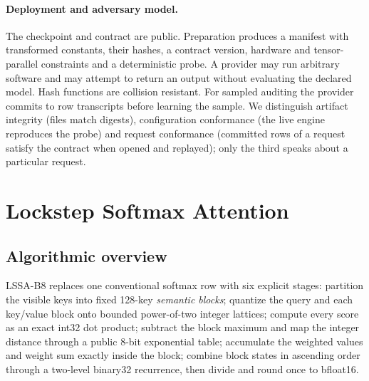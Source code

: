 \documentclass{article}
\begin{document}
\paragraph{Deployment and adversary model.}
The checkpoint and contract are public.  Preparation produces a manifest with transformed
constants, their hashes, a contract version, hardware and tensor-parallel constraints and a
deterministic probe.  A provider may run arbitrary software and may attempt to return an
output without evaluating the declared model.  Hash functions are collision resistant.  For
sampled auditing the provider commits to row transcripts before learning the sample.  We
distinguish artifact integrity (files match digests), configuration conformance (the live
engine reproduces the probe) and request conformance (committed rows of a request satisfy the
contract when opened and replayed); only the third speaks about a particular request.

\section{Lockstep Softmax Attention}
\label{sec:lssa}

\subsection{Algorithmic overview}
\label{sec:lssa-overview}

LSSA-B8 replaces one conventional softmax row with six explicit stages: partition the visible
keys into fixed 128-key \emph{semantic blocks}; quantize the query and each key/value block
onto bounded power-of-two integer lattices; compute every score as an exact int32 dot
product; subtract the block maximum and map the integer distance through a public 8-bit
exponential table; accumulate the weighted values and weight sum exactly inside the block;
combine block states in ascending order through a two-level binary32 recurrence, then divide
and round once to bfloat16.

\begin{center}
\end{center}
\end{document}
